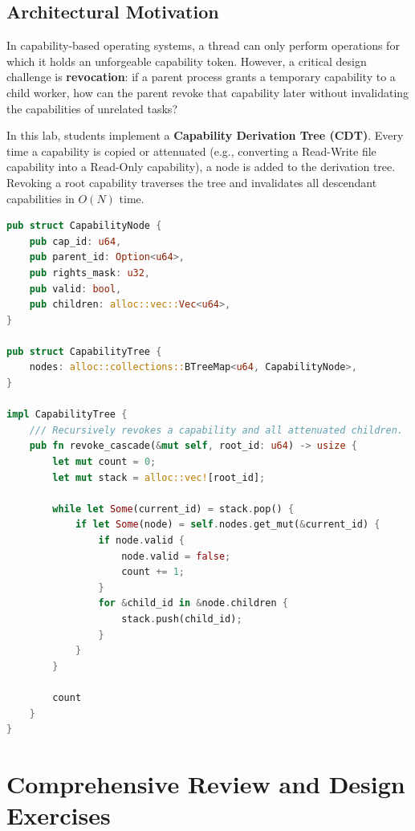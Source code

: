 \subsection{Architectural Motivation}

In capability-based operating systems, a thread can only perform operations for which it holds an unforgeable capability token. However, a critical design challenge is \textbf{revocation}: if a parent process grants a temporary capability to a child worker, how can the parent revoke that capability later without invalidating the capabilities of unrelated tasks?

In this lab, students implement a \textbf{Capability Derivation Tree (CDT)}. Every time a capability is copied or attenuated (e.g., converting a Read-Write file capability into a Read-Only capability), a node is added to the derivation tree. Revoking a root capability traverses the tree and invalidates all descendant capabilities in $O(N)$ time.

\begin{lstlisting}[language=Rust, caption={Capability Derivation Tree (\texttt{src/capability/cdt.rs})}]
pub struct CapabilityNode {
    pub cap_id: u64,
    pub parent_id: Option<u64>,
    pub rights_mask: u32,
    pub valid: bool,
    pub children: alloc::vec::Vec<u64>,
}

pub struct CapabilityTree {
    nodes: alloc::collections::BTreeMap<u64, CapabilityNode>,
}

impl CapabilityTree {
    /// Recursively revokes a capability and all attenuated children.
    pub fn revoke_cascade(&mut self, root_id: u64) -> usize {
        let mut count = 0;
        let mut stack = alloc::vec![root_id];

        while let Some(current_id) = stack.pop() {
            if let Some(node) = self.nodes.get_mut(&current_id) {
                if node.valid {
                    node.valid = false;
                    count += 1;
                }
                for &child_id in &node.children {
                    stack.push(child_id);
                }
            }
        }

        count
    }
}
\end{lstlisting}

\section{Comprehensive Review and Design Exercises}
\label{sec:all_chapters_exercises}

